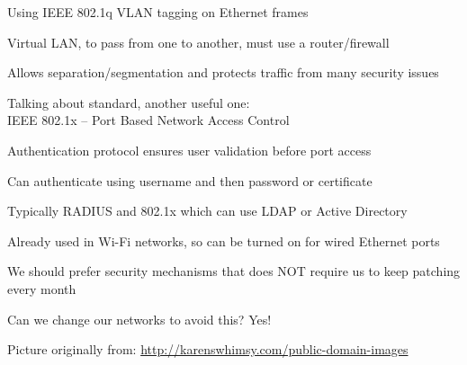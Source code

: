\documentclass[Screen16to9,17pt]{foils}
\begin{document}


\begin{list1}
\item Using IEEE 802.1q  VLAN tagging on Ethernet frames
\item Virtual LAN, to pass from one to another, must use a router/firewall
\item Allows separation/segmentation and protects traffic from many security issues
\end{list1}





Talking about standard, another useful one:\\
IEEE 802.1x -- Port Based Network Access Control


\begin{list1}
\item Authentication protocol ensures user validation before port access
\item Can authenticate using username and then password or certificate
\item Typically RADIUS and 802.1x which can use LDAP or Active Directory
\item Already used in Wi-Fi networks, so can be turned on for wired Ethernet ports
\end{list1}






\begin{list2}
\item We should prefer security mechanisms that does NOT require us to keep patching every month
\item Can we change our networks to avoid this? Yes!
\end{list2}



\centerline{Picture originally from: \url{http://karenswhimsy.com/public-domain-images}}



\end{document}
